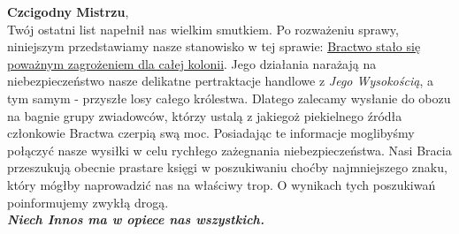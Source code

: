 \textbf{Czcigodny Mistrzu},\\

Twój ostatni list napełnił nas wielkim smutkiem. Po rozważeniu sprawy, niniejszym przedstawiamy nasze stanowisko w tej sprawie: \underline{Bractwo stało się} \underline{poważnym zagrożeniem dla całej kolonii}. Jego działania narażają na niebezpieczeństwo nasze delikatne pertraktacje handlowe z \emph{Jego Wysokością}, a tym samym - przyszłe losy całego królestwa. Dlatego zalecamy wysłanie do obozu na bagnie grupy zwiadowców, którzy ustalą z jakiegoż piekielnego źródła członkowie Bractwa czerpią swą moc. Posiadając te informacje moglibyśmy połączyć nasze wysiłki w celu rychłego zażegnania niebezpieczeństwa. Nasi Bracia przeszukują obecnie prastare księgi w poszukiwaniu choćby najmniejszego znaku, który mógłby naprowadzić nas na właściwy trop. O wynikach tych poszukiwań poinformujemy zwykłą drogą.\\

\emph{\textbf{\large Niech Innos ma w opiece nas wszystkich. \normalsize}}